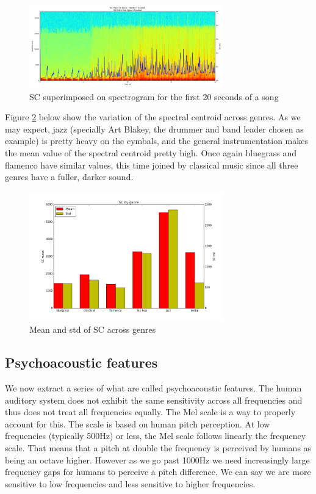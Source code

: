 \documentclass[12pt]{article}
\begin{document}
\begin{figure}
\centering
  \includegraphics[width=0.75\textwidth]{SC_Entre_Dos_Aguas.png}
  \caption{SC superimposed on spectrogram for the first 20 seconds of a song}
  \label{sc}
\end{figure}

\medskip

Figure \ref{sc_genres} below show the variation of the spectral centroid across genres. As we may expect, jazz (specially Art Blakey, the drummer and band leader chosen as example) is pretty heavy on the cymbals, and the general instrumentation makes the mean value of the spectral centroid pretty high. Once again bluegrass and flamenco have similar values, this time joined by classical music since all three genres have a fuller, darker sound. 


\begin{figure}
\centering
  \includegraphics[width=0.75\textwidth]{SC_by_genre.png}
  \caption{Mean and std of SC across genres}
  \label{sc_genres}
\end{figure}

\subsection*{Psychoacoustic features}
We now extract a series of what are called psychoacoustic features. The human auditory system does not exhibit the same sensitivity across all frequencies and thus does not treat all frequencies equally. The Mel scale is a way to properly account for this. The scale is based on human pitch perception. At low frequencies (typically 500Hz) or less, the Mel scale follows linearly the frequency scale. That means that a pitch at double the frequency is perceived by humans as being an octave higher. However as we go past 1000Hz we need increasingly large frequency gaps for humans to perceive a pitch difference. We can say we are more sensitive to low frequencies and less sensitive to higher frequencies. 
\medskip
\end{document}
